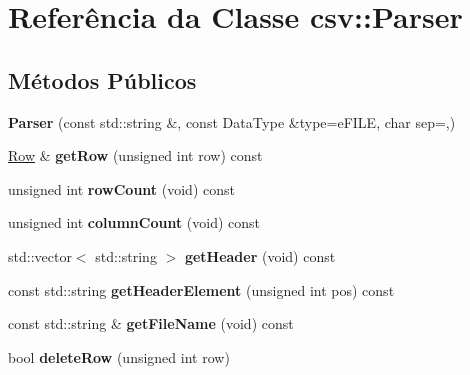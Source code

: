\hypertarget{classcsv_1_1Parser}{}\section{Referência da Classe csv\+:\+:Parser}
\label{classcsv_1_1Parser}
\subsection*{Métodos Públicos}
\begin{DoxyCompactItemize}
\item 
\mbox{\label{classcsv_1_1Parser_a071974187e0ac4496713458a66794194}} 
{\bfseries Parser} (const std\+::string \&, const Data\+Type \&type=e\+F\+I\+LE, char sep=\textquotesingle{},\textquotesingle{})
\item 
\mbox{\label{classcsv_1_1Parser_a583d39d5370197d910bbd6374ac44528}} 
\hyperlink{classcsv_1_1Row}{Row} \& {\bfseries get\+Row} (unsigned int row) const
\item 
\mbox{\label{classcsv_1_1Parser_ac37f144d86cc564c73563a6188981c1a}} 
unsigned int {\bfseries row\+Count} (void) const
\item 
\mbox{\label{classcsv_1_1Parser_abb8dbe6330c227b4f072fdf122694c61}} 
unsigned int {\bfseries column\+Count} (void) const
\item 
\mbox{\label{classcsv_1_1Parser_a4da6b8c64ed0eea017856b0f27b449bd}} 
std\+::vector$<$ std\+::string $>$ {\bfseries get\+Header} (void) const
\item 
\mbox{\label{classcsv_1_1Parser_ad970f42fbdce0dd594ed4e0170bbf7a8}} 
const std\+::string {\bfseries get\+Header\+Element} (unsigned int pos) const
\item 
\mbox{\label{classcsv_1_1Parser_a71f328f9a2393fa05c616602384890d0}} 
const std\+::string \& {\bfseries get\+File\+Name} (void) const
\item 
\mbox{\label{classcsv_1_1Parser_aeab2365b2a5479563be5b0ab93355d3c}} 
bool {\bfseries delete\+Row} (unsigned int row)
\item 

\end{DoxyCompactItemize}
